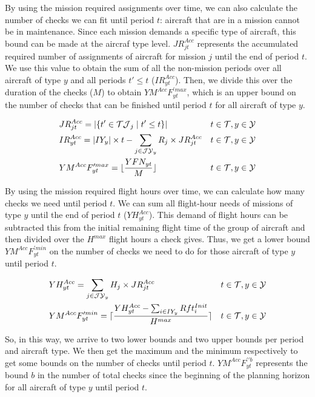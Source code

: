 \documentclass[a4paper,onecolumn,fleqn]{article}
\begin{document}
  By using the mission required assignments over time, we can also calculate the number of checks we can fit until period $t$: aircraft that are in a mission cannot be in maintenance. Since each mission demands a specific type of aircraft, this bound can be made at the aircraf type level. $JR^{Acc}_{jt}$ represents the accumulated required number of assignments of aircraft for mission $j$ until the end of period $t$.
  We use this value to obtain the sum of all the non-mission periods over all aircraft of type $y$ and all periods $t' \le t$ ($IR^{Acc}_{yt}$). Then, we divide this over the duration of the checks ($M$) to obtain $YM^{Acc}F^{\prime max}_{yt}$, which is an upper bound on the number of checks that can be finished until period $t$ for all aircraft of type $y$.

  \begin{align}
    & JR^{Acc}_{jt} = |\{t' \in \mathcal{TJ}_j \mid t' \le t\}| 
        & t \in \mathcal{T}, y \in \mathcal{Y}\notag\\
    & IR^{Acc}_{yt} = |IY_y| \times t -  \sum_{j \in \mathcal{JY}_y} R_j \times JR^{Acc}_{jt} 
        & t \in \mathcal{T}, y \in \mathcal{Y}\notag\\
    & YM^{Acc}F^{\prime max}_{yt} = \lfloor \frac{YFN_{yt}}{M} \rfloor 
        & t \in \mathcal{T}, y \in \mathcal{Y}\notag
  \end{align}

  By using the mission required flight hours over time, we can calculate how many checks we need until period $t$. We can sum all flight-hour needs of missions of type $y$ until the end of period $t$ ($YH^{Acc}_{yt}$). This demand of flight hours can be subtracted this from the initial remaining flight time of the group of aircraft and then divided over the $H^{max}$ flight hours a check gives. Thus, we get a lower bound $YM^{Acc}F^{\prime min}_{yt}$ on the number of checks we need to do for those aircraft of type $y$ until period $t$.

  \begin{align}
    & YH^{Acc}_{yt} =  \sum_{j \in \mathcal{JY}_y} H_j \times JR^{Acc}_{jt} 
        & t \in \mathcal{T}, y \in \mathcal{Y} \notag\\
    & YM^{Acc}F^{\prime min}_{yt} =  \lceil \frac{YH^{Acc}_{yt} - \sum_{i \in IY_y} Rft^{Init}_i }{H^{max}} \rceil
        & t \in \mathcal{T}, y \in \mathcal{Y} \notag
  \end{align}

  So, in this way, we arrive to two lower bounds and two upper bounds per period and aircraft type. We then get the maximum and the minimum respectively to get some bounds on the number of checks until period $t$. $YM^{Acc}F^{\prime\prime b}_{yt}$ represents the bound $b$ in the number of total checks since the beginning of the planning horizon for all aircraft of type $y$ until period $t$.
\end{document}
